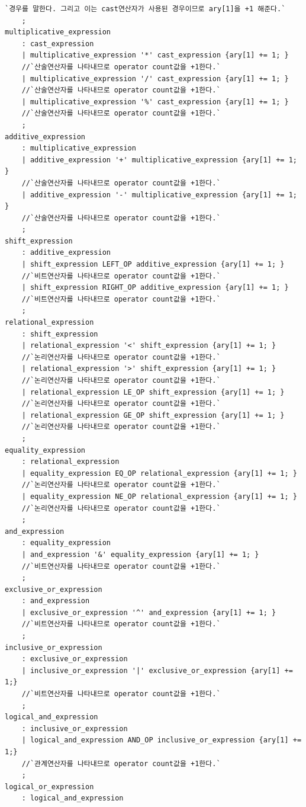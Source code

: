 \documentclass{article}
\begin{document}
\begin{lstlisting}[escapeinside=``]
	`경우를 말한다. 그리고 이는 cast연산자가 사용된 경우이므로 ary[1]을 +1 해준다.`
	;
multiplicative_expression
	: cast_expression
	| multiplicative_expression '*' cast_expression {ary[1] += 1; }
	//`산술연산자를 나타내므로 operator count값을 +1한다.`
	| multiplicative_expression '/' cast_expression {ary[1] += 1; }
	//`산술연산자를 나타내므로 operator count값을 +1한다.`
	| multiplicative_expression '%' cast_expression {ary[1] += 1; }
	//`산술연산자를 나타내므로 operator count값을 +1한다.`
	;
additive_expression
	: multiplicative_expression
	| additive_expression '+' multiplicative_expression {ary[1] += 1; }
	//`산술연산자를 나타내므로 operator count값을 +1한다.`
	| additive_expression '-' multiplicative_expression {ary[1] += 1; }
	//`산술연산자를 나타내므로 operator count값을 +1한다.`
	;
shift_expression
	: additive_expression
	| shift_expression LEFT_OP additive_expression {ary[1] += 1; }
	//`비트연산자를 나타내므로 operator count값을 +1한다.`
	| shift_expression RIGHT_OP additive_expression {ary[1] += 1; }
	//`비트연산자를 나타내므로 operator count값을 +1한다.`
	;
relational_expression
	: shift_expression
	| relational_expression '<' shift_expression {ary[1] += 1; }
	//`논리연산자를 나타내므로 operator count값을 +1한다.`
	| relational_expression '>' shift_expression {ary[1] += 1; }
	//`논리연산자를 나타내므로 operator count값을 +1한다.`
	| relational_expression LE_OP shift_expression {ary[1] += 1; }
	//`논리연산자를 나타내므로 operator count값을 +1한다.`
	| relational_expression GE_OP shift_expression {ary[1] += 1; }
	//`논리연산자를 나타내므로 operator count값을 +1한다.`
	;
equality_expression
	: relational_expression
	| equality_expression EQ_OP relational_expression {ary[1] += 1; }
	//`논리연산자를 나타내므로 operator count값을 +1한다.`
	| equality_expression NE_OP relational_expression {ary[1] += 1; }
	//`논리연산자를 나타내므로 operator count값을 +1한다.`
	;
and_expression
	: equality_expression
	| and_expression '&' equality_expression {ary[1] += 1; }
	//`비트연산자를 나타내므로 operator count값을 +1한다.`
	;
exclusive_or_expression
	: and_expression
	| exclusive_or_expression '^' and_expression {ary[1] += 1; }
	//`비트연산자를 나타내므로 operator count값을 +1한다.`
	;
inclusive_or_expression
	: exclusive_or_expression
	| inclusive_or_expression '|' exclusive_or_expression {ary[1] += 1;}
	//`비트연산자를 나타내므로 operator count값을 +1한다.`
	;
logical_and_expression
	: inclusive_or_expression
	| logical_and_expression AND_OP inclusive_or_expression {ary[1] += 1;}
	//`관계연산자를 나타내므로 operator count값을 +1한다.`
	;
logical_or_expression
	: logical_and_expression

\end{lstlisting}
\end{document}
